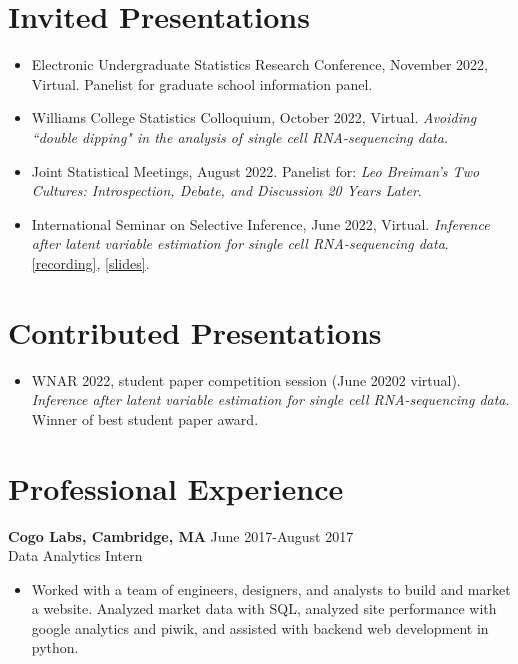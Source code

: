 \documentclass[margin, 10pt]{res} %
\begin{document}
\begin{resume}
{\section{Invited Presentations} 
\begin{itemize}
\item Electronic Undergraduate Statistics Research Conference, November 2022, Virtual. Panelist for graduate school information panel. 
\item Williams College Statistics Colloquium, October 2022, Virtual. \emph{Avoiding ``double dipping" in the analysis of single cell RNA-sequencing data.}
\item Joint Statistical Meetings, August 2022. Panelist for: \emph{Leo Breiman's Two Cultures: Introspection, Debate, and Discussion 20 Years Later}. 
\item International Seminar on Selective Inference, June 2022, Virtual. \emph{Inference after latent variable estimation for single cell RNA-sequencing data}. \href{https://drive.google.com/file/d/1U4s7xiuz5yOCeDL2hjfIPZPbD7EsmINb/view}{[recording]}, \href{https://drive.google.com/file/d/1KPX8TkT85jHYalxhieyy65PAj18PRbFF/view}{[slides]}.
\end{itemize}
\section{Contributed Presentations} 
\begin{itemize}
\item WNAR 2022, student paper competition session (June 20202 virtual). \emph{Inference after latent variable estimation for single cell RNA-sequencing data}. Winner of best student paper award. 
\end{itemize}

\section{Professional Experience}
{\textbf{Cogo Labs, Cambridge, MA}} \hfill June 2017-August 2017 \\
Data Analytics Intern
\begin{itemize}
\item Worked with a team of engineers, designers, and analysts to build and market a website. Analyzed market data with SQL, analyzed site performance with google analytics and piwik, and assisted with backend web development in python. 
\end{itemize}


}
\end{resume}
\end{document}
